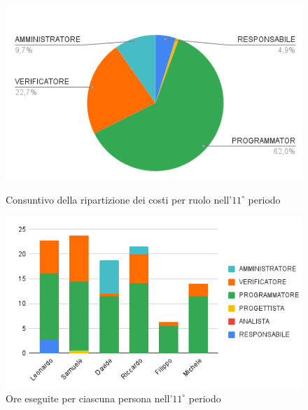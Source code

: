 \begin{figure}[H]
  \centering
  \includegraphics[width=0.6\linewidth]{grafici/11_periodo_torta_consuntivo.png}
  \caption{Consuntivo della ripartizione dei costi per ruolo nell'$11^\circ$ periodo}
        \vspace{5mm}
  \includegraphics[width=0.7\linewidth]{grafici/11_periodo_instogramma_consuntivo.png}
  \caption{Ore eseguite per ciascuna persona nell'$11^\circ$ periodo}
\end{figure}

